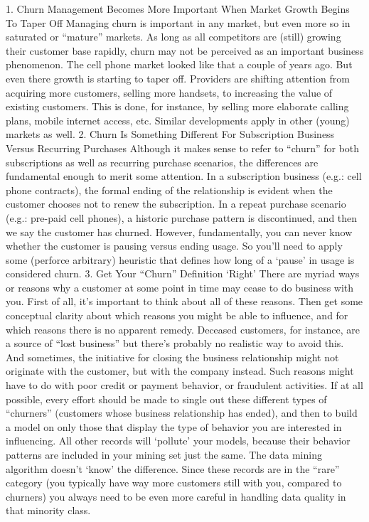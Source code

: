 1. Churn Management Becomes More Important When Market Growth Begins To Taper Off
Managing churn is important in any market, but even more so in saturated or “mature” markets. As long as all competitors are (still) growing their customer base rapidly, churn may not be perceived as an important business phenomenon. The cell phone market looked like that a couple of years ago. But even there growth is starting to taper off. 
Providers are shifting attention from acquiring more customers, selling more handsets, to increasing the value of existing customers. This is done, for instance, by selling more elaborate calling plans, mobile internet access, etc. Similar developments apply in other (young) markets as well.
2. Churn Is Something Different For Subscription Business Versus Recurring Purchases
Although it makes sense to refer to “churn” for both subscriptions as well as recurring purchase scenarios, the differences are fundamental enough to merit some attention. In a subscription business (e.g.: cell phone contracts), the formal ending of the relationship is evident when the customer chooses not to renew the subscription. In a repeat purchase scenario (e.g.: pre-paid cell phones), a historic purchase pattern is discontinued, and then we say the customer has churned. However, fundamentally, you can never know whether the customer is pausing versus ending usage. So you’ll need to apply some (perforce arbitrary) heuristic that defines how long of a ‘pause’ in usage is considered churn.
3. Get Your “Churn” Definition ‘Right’
There are myriad ways or reasons why a customer at some point in time may cease to do business with you. First of all, it’s important to think about all of these reasons. Then get some conceptual clarity about which reasons you might be able to influence, and for which reasons there is no apparent remedy. Deceased customers, for instance, are a source of “lost business” but there’s probably no realistic way to avoid this. And sometimes, the initiative for closing the business relationship might not originate with the customer, but with the company instead. Such reasons might have to do with poor credit or payment behavior, or fraudulent activities. 
If at all possible, every effort should be made to single out these different types of “churners” (customers whose business relationship has ended), and then to build a model on only those that display the type of behavior you are interested in influencing. All other records will ‘pollute’ your models, because their behavior patterns are included in your mining set just the same. The data mining algorithm doesn’t ‘know’ the difference. Since these records are in the “rare” category (you typically have way more customers still with you, compared to churners) you always need to be even more careful in handling data quality in that minority class.
